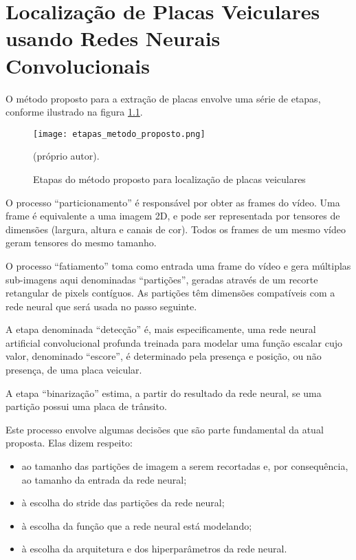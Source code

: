 \chapter{Localização de Placas Veiculares usando Redes Neurais Convolucionais}
	\label{ses:metodo}

O método proposto para a extração de placas envolve uma série de etapas,
conforme ilustrado na figura \ref{fig:etapas_metodo_proposto}.

\begin{figure}[!htb]
	\centering
	\texttt{[image: etapas\_metodo\_proposto.png]}
	\caption{Etapas do método proposto para localização de placas veiculares}
	\label{fig:etapas_metodo_proposto}
	(próprio autor).
\end{figure}

O processo “particionamento” é responsável por obter as frames do vídeo. Uma
frame é equivalente a uma imagem 2D, e pode ser representada por tensores de
dimensões  (largura, altura e canais de cor). Todos os frames de um mesmo vídeo
geram tensores do mesmo tamanho.

O processo “fatiamento” toma como entrada uma frame do vídeo e gera múltiplas
sub-imagens aqui denominadas “partições”, geradas através de um recorte
retangular de pixels contíguos. As partições têm dimensões compatíveis com a
rede neural que será usada no passo seguinte.

A etapa denominada “detecção” é, mais especificamente, uma rede neural
artificial convolucional profunda treinada para modelar uma função escalar cujo
valor, denominado “escore”, é determinado pela presença e posição, ou não
presença, de uma placa veicular.

A etapa “binarização” estima, a partir do resultado da rede neural, se uma
partição possui uma placa de trânsito.

Este processo envolve algumas decisões que são parte fundamental da atual
proposta. Elas dizem respeito:

\begin{itemize}
\item ao tamanho das partições de imagem a serem recortadas e, por
	consequência, ao tamanho da entrada da rede neural;
\item à escolha do stride das partições da rede neural;
\item à escolha da função que a rede neural está modelando;
\item à escolha da arquitetura e dos hiperparâmetros da rede neural.
\end{itemize}

